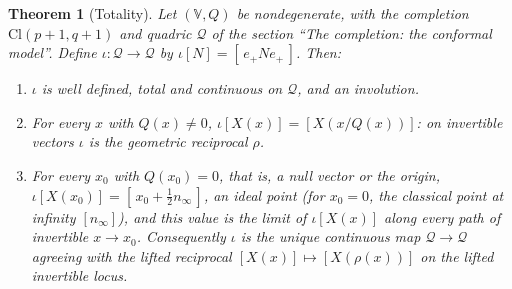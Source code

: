 \documentclass[11pt]{article}
\newtheorem{theorem}{Theorem}[section]
\theoremstyle{definition}
\theoremstyle{plain}
\providecommand{\Cl}{}\renewcommand{\Cl}{\mathrm{Cl}}
\providecommand{\nInf}{}\renewcommand{\nInf}{n_\infty}
\begin{document}
\begin{theorem}[Totality]\label{c:transport.totality}
Let $(\mathbb{V}, Q)$ be nondegenerate, with the completion $\Cl(p{+}1,q{+}1)$ and quadric $\mathcal{Q}$ of the section ``The completion: the conformal model''. Define $\iota : \mathcal{Q} \to \mathcal{Q}$ by $\iota[N] = [\,e_+ N e_+\,]$. Then:
\begin{enumerate}
\item $\iota$ is well defined, total and continuous on $\mathcal{Q}$, and an involution.
\item For every $x$ with $Q(x) \neq 0$, \; $\iota[X(x)] = [X(x/Q(x))]$: on invertible vectors $\iota$ is the geometric reciprocal $\rho$.
\item For every $x_0$ with $Q(x_0) = 0$, that is, a null vector or the origin, $\iota[X(x_0)] = [\, x_0 + \tfrac12 \nInf \,]$, an ideal point (for $x_0 = 0$, the classical point at infinity $[\nInf]$), and this value is the limit of $\iota[X(x)]$ along every path of invertible $x \to x_0$. Consequently $\iota$ is the unique continuous map $\mathcal{Q} \to \mathcal{Q}$ agreeing with the lifted reciprocal $[X(x)] \mapsto [X(\rho(x))]$ on the lifted invertible locus.
\end{enumerate}
\end{theorem}
\end{document}
